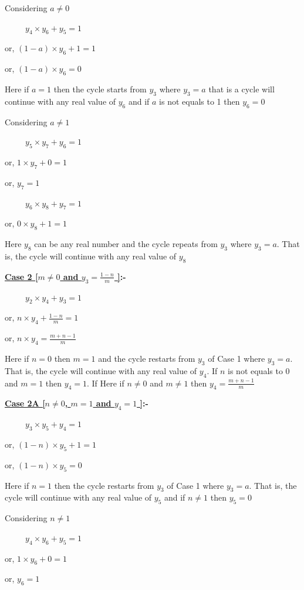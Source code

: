 \documentclass{article}
\begin{document}
\begin{enumerate}
Considering $a\neq0$

\ \ \ \ \ $y_4\times y_6 + y_5=1$

or, $(1-a)\times y_6+ 1=1$

or, $(1-a)\times y_6=0$

Here if $a=1$ then the cycle starts from $y_3$ where $y_3=a$ that is a cycle will continue with any real value of $y_6$ and if $a$ is not equals to 1 then $y_6=0$

\bigskip

Considering $a\neq1$

\ \ \ \ \ $y_5\times y_7 + y_6=1$

or, $1\times y_7+ 0=1$

or, $y_7=1$
\bigskip

\ \ \ \ \ $y_6\times y_8 + y_7=1$

or, $0\times y_8+ 1=1$

Here $y_8$ can be any real number and the cycle repeats from $y_3$ where $y_3=a$. That is, the cycle will continue with any real value of $y_8$
\bigskip

\bigskip

\textbf{ \underline{\large{Case 2 [$m\neq0$ and $y_3=\frac{1-n}{m}$ ]}}:-}

\ \ \ \ \ $y_2\times y_4 + y_3=1$

or, $n\times y_4+ \frac{1-n}{m}=1$

or, $n\times y_4=\frac{m+n-1}{m}$

Here if $n=0$ then $m=1$ and the cycle restarts from $y_3$ of Case 1 where $y_3=a$. That is, the cycle will continue with any real value of $y_4$. If  $n$ is not equals to 0 and $m=1$ then $y_4=1$. If Here if $n\neq 0$ and $m\neq 1$ then $y_4=\frac{m+n-1}{m}$
\bigskip

\textbf{ \underline{\large{Case 2A [$n\neq0$, $m=1$ and $y_4=1$ ]}}:-}

\ \ \ \ \ $y_3\times y_5 + y_4=1$

or, $(1-n)\times y_5+ 1=1$

or, $(1-n)\times y_5=0$

Here if $n=1$ then the cycle restarts from $y_3$ of Case 1 where $y_3=a$. That is, the cycle will continue with any real value of $y_5$ and if $n\neq 1$ then $y_5=0$

Considering $n\neq 1$

\ \ \ \ \ $y_4\times y_6 + y_5=1$

or, $1\times y_6+ 0=1$

or, $y_6=1$
\bigskip


\end{enumerate}
\end{document}
